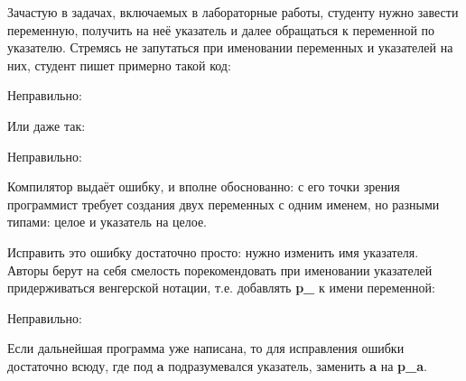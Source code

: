 \begin{typerror}
	\label{TE_same-names-for-var-and-pointer}

	Зачастую в задачах, включаемых в лабораторные работы, студенту нужно завести переменную,
	получить на неё указатель и далее обращаться к переменной по указателю.
	Стремясь не запутаться при именовании переменных и указателей на них,
	студент пишет примерно такой код:

	Неправильно:

	Или даже так:
	
	Неправильно:

	Компилятор выдаёт ошибку, и вполне обоснованно:
	с его точки зрения программист требует создания двух переменных с одним именем, но разными типами:
	целое и указатель на целое.
	
	Исправить это ошибку достаточно просто: нужно изменить имя указателя.
	Авторы берут на себя смелость порекомендовать при именовании указателей придерживаться венгерской нотации,
	т.е. добавлять \textbf{p\_} к имени переменной:

	Неправильно:
	
	Если дальнейшая программа уже написана, то для исправления ошибки достаточно всюду,
	где под \textbf{a} подразумевался указатель, заменить \textbf{a} на \textbf{p\_a}.
	
\end{typerror}
